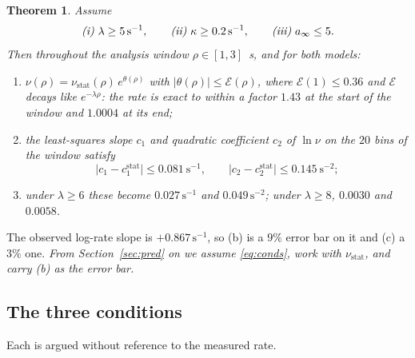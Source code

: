 \documentclass[11pt,a4paper]{article}
\newtheorem{theorem}[proposition]{Theorem}
\theoremstyle{remark}\newtheorem{remark}[proposition]{Remark}
\newcommand{\nustat}{\nu_{\mathrm{stat}}}
\begin{document}
\begin{theorem}\label{thm:main}
Assume
\begin{equation}
\text{\emph{(i)}}\ \lambda\ge5\,\mathrm{s}^{-1},\qquad
\text{\emph{(ii)}}\ \kappa\ge0.2\,\mathrm{s}^{-1},\qquad
\text{\emph{(iii)}}\ a_\infty\le5 .
\label{eq:conds}
\end{equation}
Then throughout the analysis window $\rho\in[1,3]$~s, and for both models:
\begin{enumerate}
\item[\emph{(a)}] $\nu(\rho)=\nustat(\rho)\,e^{\theta(\rho)}$ with
$|\theta(\rho)|\le\mathcal{E}(\rho)$, where $\mathcal{E}(1)\le0.36$ and
$\mathcal{E}$ decays like $e^{-\lambda\rho}$: the rate is exact to within a factor
$1.43$ at the start of the window and $1.0004$ at its end;
\item[\emph{(b)}] the least-squares slope $c_1$ and quadratic coefficient $c_2$ of
$\ln\nu$ on the $20$ bins of the window satisfy
\[
\bigl|c_1-c_1^{\mathrm{stat}}\bigr|\le0.081\ \mathrm{s}^{-1},
\qquad
\bigl|c_2-c_2^{\mathrm{stat}}\bigr|\le0.145\ \mathrm{s}^{-2};
\]
\item[\emph{(c)}] under $\lambda\ge6$ these become $0.027\,\mathrm{s}^{-1}$ and
$0.049\,\mathrm{s}^{-2}$; under $\lambda\ge8$, $0.0030$ and $0.0058$.
\end{enumerate}
\end{theorem}

\noindent The observed log-rate slope is $+0.867\,\mathrm{s}^{-1}$, so (b) is a $9\%$
error bar on it and (c) a $3\%$ one. \emph{From Section~\ref{sec:pred} on we assume
\eqref{eq:conds}, work with $\nustat$, and carry (b) as the error bar.}

\subsection{The three conditions}\label{sec:conds}

Each is argued without reference to the measured rate.
\end{document}
